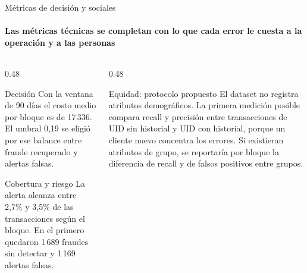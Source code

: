 \documentclass[aspectratio=169,11pt]{beamer}
\begin{document}
\begin{frame}{Métricas de decisión y sociales}
  \framesubtitle{Las métricas técnicas se completan con lo que cada error le cuesta a la operación y a las personas}
  \begin{columns}[T]
    \begin{column}{0.48\textwidth}
      \begin{block}{Decisión}
        \small Con la ventana de 90 días el costo medio por bloque es de 17\,336. El umbral 0,19 se eligió por ese balance entre fraude recuperado y alertas falsas.
      \end{block}
      \begin{block}{Cobertura y riesgo}
        \small La alerta alcanza entre 2,7\% y 3,5\% de las transacciones según el bloque. En el primero quedaron 1\,689 fraudes sin detectar y 1\,169 alertas falsas.
      \end{block}
    \end{column}
    \begin{column}{0.48\textwidth}
      \begin{block}{Equidad: protocolo propuesto}
        \small El dataset no registra atributos demográficos. La primera medición posible compara recall y precisión entre transacciones de UID sin historial y UID con historial, porque un cliente nuevo concentra los errores. Si existieran atributos de grupo, se reportaría por bloque la diferencia de recall y de falsos positivos entre grupos.
      \end{block}
    \end{column}
  \end{columns}
\end{frame}
\end{document}
